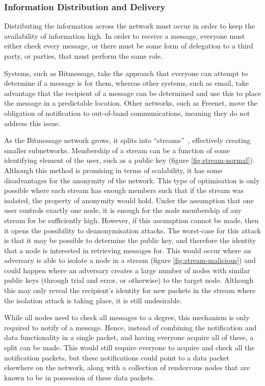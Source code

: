 		\subsubsection{Information Distribution and Delivery}
			Distributing the information across the network must occur in order to keep the availability of information high. In order to receive a message, everyone must either check every message, or there must be some form of delegation to a third party, or parties, that must perform the same role.
			
			Systems, such as Bitmessage, take the approach that everyone can attempt to determine if a message is for them, whereas other systems, such as email, take advantage that the recipient of a message can be determined and use this to place the message in a predictable location. Other networks, such as Freenet, move the obligation of notification to out-of-band communications, meaning they do not address this issue.
			
			As the Bitmessage network grows, it splits into ``streams''~\cite{bitmsg}, effectively creating smaller subnetworks. Membership of a stream can be a function of some identifying element of the user, such as a public key (figure \ref{fig:stream-normal}). Although this method is promising in terms of scalability, it has some disadvantages for the anonymity of the network. This type of optimisation is only possible where each stream has enough members such that if the stream was isolated, the property of anonymity would hold. Under the assumption that one user controls exactly one node, it is enough for the node membership of any stream for be sufficiently high. However, if this assumption cannot be made, then it opens the possibility to deanonymisation attacks. The worst-case for this attack is that it may be possible to determine the public key, and therefore the identity that a node is interested in retrieving messages for. This would occur where an adversary is able to isolate a node in a stream (figure \ref{fig:stream-malicious}) and could happen where an adversary creates a large number of nodes with similar public keys (through trial and error, or otherwise) to the target node. Although this may only reveal the recipient's identity for new packets in the stream where the isolation attack is taking place, it is still undesirable.
			
			
			
			While all nodes need to check all messages to a degree, this mechanism is only required to notify of a message. Hence, instead of combining the notification and data functionality in a single packet, and having everyone acquire all of these, a split can be made. This would still require everyone to acquire and check all the notification packets, but these notifications could point to a data packet elsewhere on the network, along with a collection of rendezvous nodes that are known to be in possession of these data packets.
			
